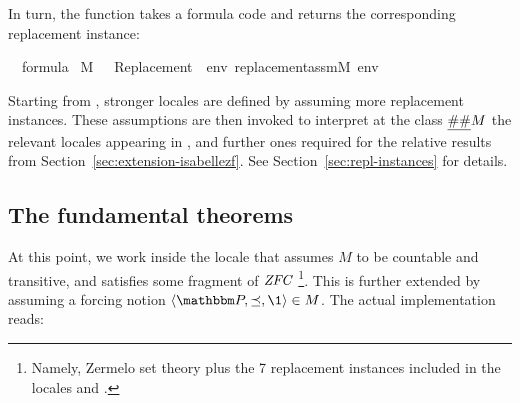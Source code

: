 In turn, the  function
takes a formula code and returns the corresponding replacement
instance:
\begin{isabelle}
{\isasymphi}\ {\isasymin}\ formula\ {\isasymLongrightarrow}\isanewline
{\isacharparenleft}{\kern0pt}M{\isacharcomma}{\kern0pt}\ {\isacharbrackleft}{\kern0pt}{\isacharbrackright}{\kern0pt}\ {\isasymTurnstile}\ {\isasymcdot}Replacement{\isacharparenleft}{\kern0pt}{\isasymphi}{\isacharparenright}{\kern0pt}{\isasymcdot}{\isacharparenright}{\kern0pt}\ {\isasymlongleftrightarrow}\ {\isacharparenleft}{\kern0pt}{\isasymforall}env{\isachardot}{\kern0pt}\ replacement{\isacharunderscore}{\kern0pt}assm{\isacharparenleft}{\kern0pt}M{\isacharcomma}{\kern0pt}\ env{\isacharcomma}{\kern0pt}\ {\isasymphi}{\isacharparenright}{\kern0pt}{\isacharparenright}
\end{isabelle}

Starting from , stronger locales are
defined by assuming more replacement instances.
These assumptions are then invoked to interpret at the class
$\isa{\#\#} M$ the relevant locales appearing in
, and further ones required for the relative
results from Section~\ref{sec:extension-isabellezf}. See
Section~\ref{sec:repl-instances} for details.


\subsection{The fundamental theorems}\label{sec:fundamental-theorems}
At this point, we work inside the locale  that
assumes $M$ to be
countable and transitive, and satisfies some fragment of
$\mathit{ZFC}$%
\footnote{%
Namely, Zermelo set theory plus the 7 replacement instances included in
the locales  and .
}.
This is further extended by assuming a forcing notion
$\lb \PP, {\preceq} ,\1\rb \in M$. The actual implementation reads:

